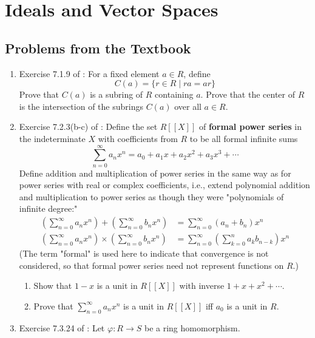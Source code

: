 \documentclass[../psets.tex]{subfiles}
\begin{document}
\section{Ideals and Vector Spaces}
\subsection*{Problems from the Textbook}
\begin{enumerate}
    \item {}Exercise 7.1.9 of \textcite{bib:DummitFoote}: For a fixed element $a\in R$, define
    \begin{equation*}
        C(a) = \{r\in R\mid ra=ar\}
    \end{equation*}
    Prove that $C(a)$ is a subring of $R$ containing $a$. Prove that the center of $R$ is the intersection of the subrings $C(a)$ over all $a\in R$.
    \item Exercise 7.2.3(b-c) of \textcite{bib:DummitFoote}: Define the set $R[[X]]$ of \textbf{formal power series} in the indeterminate $X$ with coefficients from $R$ to be all formal infinite sums
    \begin{equation*}
        \sum_{n=0}^\infty a_nx^n = a_0+a_1x+a_2x^2+a_3x^3+\cdots
    \end{equation*}
    Define addition and multiplication of power series in the same way as for power series with real or complex coefficients, i.e., extend polynomial addition and multiplication to power series as though they were "polynomials of infinite degree:"
    \begin{align*}
        \left( \sum_{n=0}^\infty a_nx^n \right)+\left( \sum_{n=0}^\infty b_nx^n \right) &= \sum_{n=0}^\infty(a_n+b_n)x^n\\
        \left( \sum_{n=0}^\infty a_nx^n \right)\times\left( \sum_{n=0}^\infty b_nx^n \right) &= \sum_{n=0}^\infty\left( \sum_{k=0}^na_kb_{n-k} \right)x^n
    \end{align*}
    (The term "formal" is used here to indicate that convergence is not considered, so that formal power series need not represent functions on $R$.)
    \begin{enumerate}[start=2,label={\textbf{(\alph*)}}]
        \item Show that $1-x$ is a unit in $R[[X]]$ with inverse $1+x+x^2+\cdots$.
        \item Prove that $\sum_{n=0}^\infty a_nx^n$ is a unit in $R[[X]]$ iff $a_0$ is a unit in $R$.
    \end{enumerate}
    \item Exercise 7.3.24 of \textcite{bib:DummitFoote}: Let $\varphi:R\to S$ be a ring homomorphism.

\end{enumerate}
\end{document}
